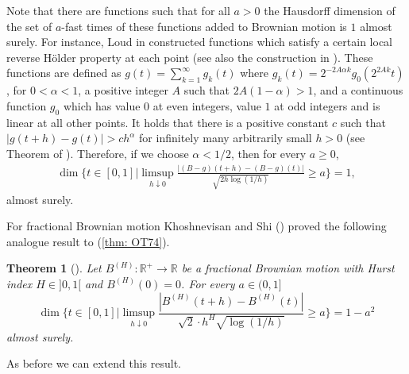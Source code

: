 \documentclass[11pt, reqno]{amsart}
\theoremstyle{plain}
\newtheorem{theorem}{Theorem}[section]
\theoremstyle{definition}
\theoremstyle{remark}
\begin{document}
Note that there are functions such that for all $a>0$ the Hausdorff dimension of the set of $a$-fast times of these functions added to Brownian motion is $1$ almost surely.
For instance, Loud in \cite{Loud} constructed functions which satisfy a certain local reverse H\"{o}lder property at each point (see also the construction in \cite{MarxPiranian}).
These functions are defined as $g(t) = \sum_{k=1}^\infty g_k(t)$ where $g_k(t) = 2^{-2A\alpha k}g_0(2^{2Ak}t)$, for $0 < \alpha < 1$, a positive integer $A$ such that $2A(1-\alpha) > 1$,
 and a continuous function $g_0$ which has value $0$ at even integers, value $1$ at odd integers and is linear at all other points.
It holds that there is a positive constant $c$ such that $|g(t+h) -g(t) | > c h^{\alpha}$ for infinitely many arbitrarily small $h>0$ (see Theorem of \cite{Loud}).
Therefore, if we choose $\alpha < 1/2$, then for every $a\geq 0$,
\begin{align*}
\dim \Big\{ t\in[0,1] \Big| \limsup_{h \downarrow 0} \frac{|(B-g)(t+h)-(B-g)(t)|}{\sqrt{2h\log{(1/h)}}} \geq a \Big\} =1,
\end{align*}
almost surely.

For fractional Brownian motion Khoshnevisan and Shi (\cite{KS}) proved the following analogue result to (\ref{thm: OT74}).

\begin{theorem}[\cite{KS}] \label{thm: KS}
Let $B^{(H)} \colon \mathbb{R}^+ \to \mathbb{R}$ be a fractional Brownian motion with Hurst index $H\in]0,1[$ and $B^{(H)}(0)=0$. For every $a\in(0,1]$
\[
\dim \Big\{ t\in[0,1] \Big| \limsup_{h \downarrow 0} \frac{|B^{(H)}(t+h)-B^{(H)}(t)|}{\sqrt{2}\cdot h^{H}\sqrt{\log{(1/h)}}} \geq a  \Big\} = 1-a^2
\]
almost surely.
\end{theorem}

As before we can extend this result.
\end{document}
